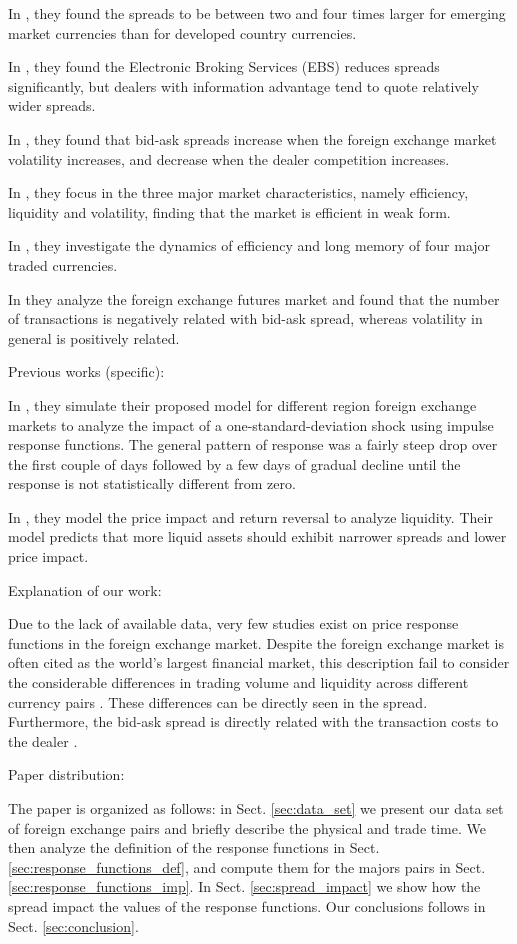 In \cite{curr_speculation}, they found the spreads to be between two and four
times larger for emerging market currencies than for developed country currencies.

In \cite{electronic_forex}, they found the Electronic Broking Services (EBS)
reduces spreads significantly, but dealers with information advantage tend to
quote relatively wider spreads.

In \cite{spread_competition}, they found that bid-ask spreads increase when the
foreign exchange market volatility increases, and decrease when the dealer
competition increases.

In \cite{intraday_forex}, they focus in the three major market characteristics,
namely efficiency, liquidity and volatility, finding that the market is
efficient in weak form.

In \cite{forex_inefficiency}, they investigate the dynamics of efficiency and
long memory of four major traded currencies.

In \cite{spread_futures} they analyze the foreign exchange futures market and
found that the number of transactions is negatively related with bid-ask
spread, whereas volatility in general is positively related.




Previous works (specific):

In \cite{forex_volatility}, they simulate their proposed model for different
region foreign exchange markets to analyze the
impact of a one-standard-deviation shock using impulse response functions. The
general pattern of response was a fairly steep drop over the first couple of
days followed by a few days of gradual decline until the response is not
statistically different from zero.

In \cite{forex_liquidity}, they model the price impact and return reversal to
analyze liquidity. Their model predicts that more liquid assets should exhibit
narrower spreads and lower price impact.




Explanation of our work:

Due to the lack of available data, very few studies exist on price response functions in the foreign exchange
market.
Despite the foreign exchange market is often cited as the world's largest financial
market, this description fail to consider the considerable differences in trading
volume and liquidity across different currency pairs \cite{forex_microstructure}. These differences can be
directly seen in the spread. Furthermore, the bid-ask spread is directly related
with the transaction costs to the dealer \cite{teach_spread,spread_futures}.




Paper distribution:

The paper is organized as follows: in Sect. \ref{sec:data_set} we present our
data set of foreign exchange pairs and briefly describe the physical and trade time. We then
analyze the definition of the response functions in Sect.
\ref{sec:response_functions_def}, and compute them for the majors pairs in
Sect. \ref{sec:response_functions_imp}.
In Sect. \ref{sec:spread_impact} we show how the spread impact the values of the
response functions. Our conclusions follows in Sect. \ref{sec:conclusion}.